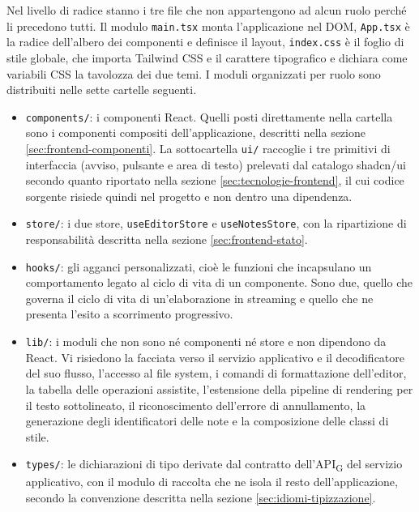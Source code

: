 \documentclass[a4paper, 10pt]{article}
\begin{document}
Nel livello di radice stanno i tre file che non appartengono ad alcun ruolo perché li precedono tutti. Il modulo \texttt{main.tsx} monta l'applicazione nel DOM, \texttt{App.tsx} è la radice dell'albero dei componenti e definisce il layout, \texttt{index.css} è il foglio di stile globale, che importa Tailwind CSS e il carattere tipografico e dichiara come variabili CSS la tavolozza dei due temi. I moduli organizzati per ruolo sono distribuiti nelle sette cartelle seguenti.

\begin{itemize}
    \setlength{\itemsep}{3pt}
    \item \texttt{components/}: i componenti React. Quelli posti direttamente nella cartella sono i componenti compositi dell'applicazione, descritti nella sezione \ref{sec:frontend-componenti}. La sottocartella \texttt{ui/} raccoglie i tre primitivi di interfaccia (avviso, pulsante e area di testo) prelevati dal catalogo shadcn/ui secondo quanto riportato nella sezione \ref{sec:tecnologie-frontend}, il cui codice sorgente risiede quindi nel progetto e non dentro una dipendenza.

    \item \texttt{store/}: i due store, \texttt{useEditorStore} e \texttt{useNotesStore}, con la ripartizione di responsabilità descritta nella sezione \ref{sec:frontend-stato}.

    \item \texttt{hooks/}: gli agganci personalizzati, cioè le funzioni che incapsulano un comportamento legato al ciclo di vita di un componente. Sono due, quello che governa il ciclo di vita di un'elaborazione in streaming e quello che ne presenta l'esito a scorrimento progressivo.

    \item \texttt{lib/}: i moduli che non sono né componenti né store e non dipendono da React. Vi risiedono la facciata verso il servizio applicativo e il decodificatore del suo flusso, l'accesso al file system, i comandi di formattazione dell'editor, la tabella delle operazioni assistite, l'estensione della pipeline di rendering per il testo sottolineato, il riconoscimento dell'errore di annullamento, la generazione degli identificatori delle note e la composizione delle classi di stile.

    \item \texttt{types/}: le dichiarazioni di tipo derivate dal contratto dell'API\textsubscript{G} del servizio applicativo, con il modulo di raccolta che ne isola il resto dell'applicazione, secondo la convenzione descritta nella sezione \ref{sec:idiomi-tipizzazione}.


\end{itemize}
\end{document}
